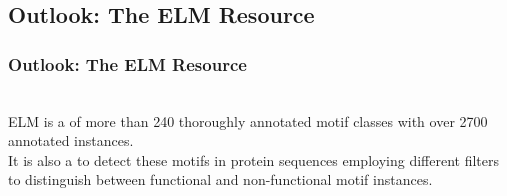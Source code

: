 \documentclass{beamer}
\newcommand\Paper[3]{%
\begin{textblock*}{.98\textwidth}(5pt,.98\textheight)%
 \begin{spacing}{.5} 
{\sc\scriptsize \textsl{``\raggedright #1''};
{\tiny #2; (#3)}}
\end{spacing}
\end{textblock*}}
\begin{document}
\subsection{Outlook: The ELM Resource}
\begin{frame}[t]\frametitle{Outlook: The ELM Resource}
    \begin{center}\end{center}\\%
    ELM is a  of more than 240 thoroughly annotated motif
    classes with over 2700 annotated instances. \\
    It is also a  to detect these motifs in protein sequences employing different filters to distinguish between \alert{functional}
    and \alert{non-functional} motif instances.\\%
\end{frame}
\end{document}
